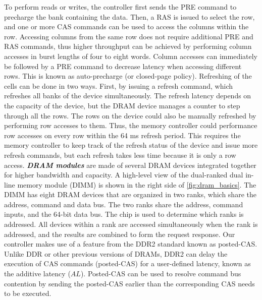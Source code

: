 To perform reads or writes, the controller first sends the PRE command to precharge the bank containing the data. 
Then, a RAS is issued to select the row, and one or more CAS commands can be used to access the columns within the row. 
Accessing columns from the same row does not require additional PRE and RAS commands, thus higher throughput can be achieved by performing column accesses in burst lengths of four to eight words.  
Column accesses can immediately be followed by a PRE command to decrease latency when accessing different rows. 
This is known as auto-precharge (or closed-page policy).
Refreshing of the cells can be done in two ways.
First, by issuing a refresh command, which refreshes all banks of the device simultaneously. 
The refresh latency depends on the capacity of the device, but the DRAM device manages a counter to step through all the rows.
The rows on the device could also be manually refreshed by performing row accesses to them.
Thus, the memory controller could performance row accesses on every row within the 64 ms refresh period.
This requires the memory controller to keep track of the refresh status of the device and issue more refresh commands, but each refresh takes less time because it is only a row access. 
\textbf{\emph{DRAM modules}} are made of several DRAM devices integrated together for higher bandwidth and capacity. 
A high-level view of the dual-ranked dual in-line memory module (DIMM) is shown in the right side of \ref{fig:dram_basics}.
The DIMM has eight DRAM devices that are organized in two ranks, which share the address, command and data bus. 
The two ranks share the address, command inputs, and the 64-bit data bus.
The chip is used to determine which ranks is addressed.
All devices within a rank are accessed simultaneously when the rank is addressed, and the results are combined to form the request response.  
Our controller makes use of a feature from the DDR2 standard known as posted-CAS.  
Unlike DDR or other previous versions of DRAMs, DDR2 can delay the execution of CAS commands (posted-CAS) for a user-defined latency, known as the additive latency ($AL$). 
Posted-CAS can be used to resolve command bus contention by sending the posted-CAS earlier than the corresponding CAS needs to be executed.

